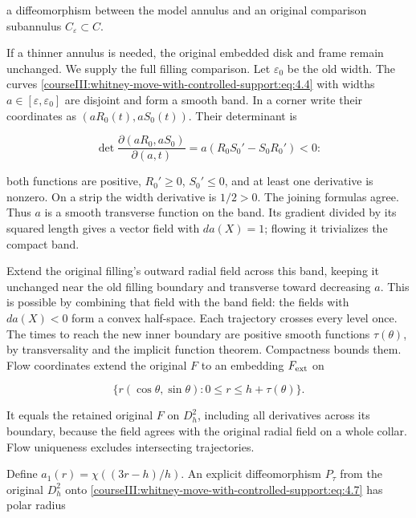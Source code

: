a diffeomorphism between the model annulus and an original comparison subannulus \(C_\varepsilon\subset C\).

If a thinner annulus is needed, the original embedded disk and frame remain unchanged. We supply the full filling comparison. Let \(\varepsilon_0\) be the old width. The curves \eqref{courseIII:whitney-move-with-controlled-support:eq:4.4} with widths \(a\in[\varepsilon,\varepsilon_0]\) are disjoint and form a smooth band. In a corner write their coordinates as \((aR_0(t),aS_0(t))\). Their determinant is

\begin{equation}
\det\frac{\partial(aR_0,aS_0)}{\partial(a,t)}
=a(R_0S_0'-S_0R_0')<0:
\label{courseIII:whitney-move-with-controlled-support:eq:4.6}
\end{equation}

both functions are positive, \(R_0'\geq0\), \(S_0'\leq0\), and at least one derivative is nonzero. On a strip the width derivative is \(1/2>0\). The joining formulas agree. Thus \(a\) is a smooth transverse function on the band. Its gradient divided by its squared length gives a vector field with \(da(X)=1\); flowing it trivializes the compact band.

Extend the original filling's outward radial field across this band, keeping it unchanged near the old filling boundary and transverse toward decreasing \(a\). This is possible by combining that field with the band field: the fields with \(da(X)<0\) form a convex half-space. Each trajectory crosses every level once. The times to reach the new inner boundary are positive smooth functions \(\tau(\theta)\), by transversality and the implicit function theorem. Compactness bounds them. Flow coordinates extend the original \(F\) to an embedding \(F_{\rm ext}\) on

\begin{equation}
\{r(\cos\theta,\sin\theta):0\leq r\leq h+\tau(\theta)\}.
\label{courseIII:whitney-move-with-controlled-support:eq:4.7}
\end{equation}

It equals the retained original \(F\) on \(D_h^2\), including all derivatives across its boundary, because the field agrees with the original radial field on a whole collar. Flow uniqueness excludes intersecting trajectories.

Define \(a_1(r)=\chi((3r-h)/h)\). An explicit diffeomorphism \(P_\tau\) from the original \(D_h^2\) onto \eqref{courseIII:whitney-move-with-controlled-support:eq:4.7} has polar radius

